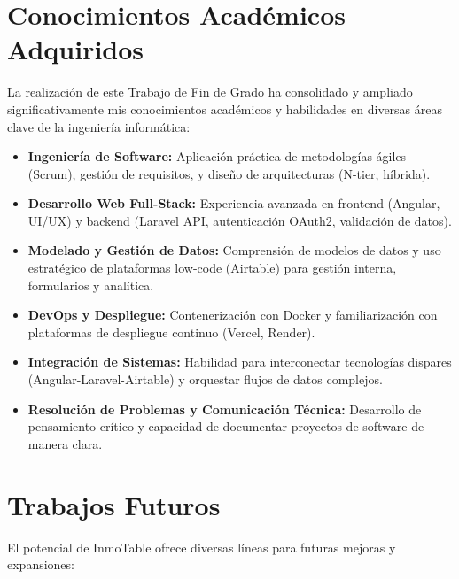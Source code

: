 \section{Conocimientos Académicos Adquiridos}


La realización de este Trabajo de Fin de Grado ha consolidado y ampliado significativamente mis conocimientos académicos y habilidades en diversas áreas clave de la ingeniería informática:

\begin{itemize}
    \item \textbf{Ingeniería de Software:} Aplicación práctica de metodologías ágiles (Scrum), gestión de requisitos, y diseño de arquitecturas (N-tier, híbrida).

    \item \textbf{Desarrollo Web Full-Stack:} Experiencia avanzada en frontend (Angular, UI/UX) y backend (Laravel API, autenticación OAuth2, validación de datos).

    \item \textbf{Modelado y Gestión de Datos:} Comprensión de modelos de datos y uso estratégico de plataformas low-code (Airtable) para gestión interna, formularios y analítica.

    \item \textbf{DevOps y Despliegue:} Contenerización con Docker y familiarización con plataformas de despliegue continuo (Vercel, Render).

    \item \textbf{Integración de Sistemas:} Habilidad para interconectar tecnologías dispares (Angular-Laravel-Airtable) y orquestar flujos de datos complejos.

    \item \textbf{Resolución de Problemas y Comunicación Técnica:} Desarrollo de pensamiento crítico y capacidad de documentar proyectos de software de manera clara.
\end{itemize}


\section{Trabajos Futuros}


El potencial de InmoTable ofrece diversas líneas para futuras mejoras y expansiones:

